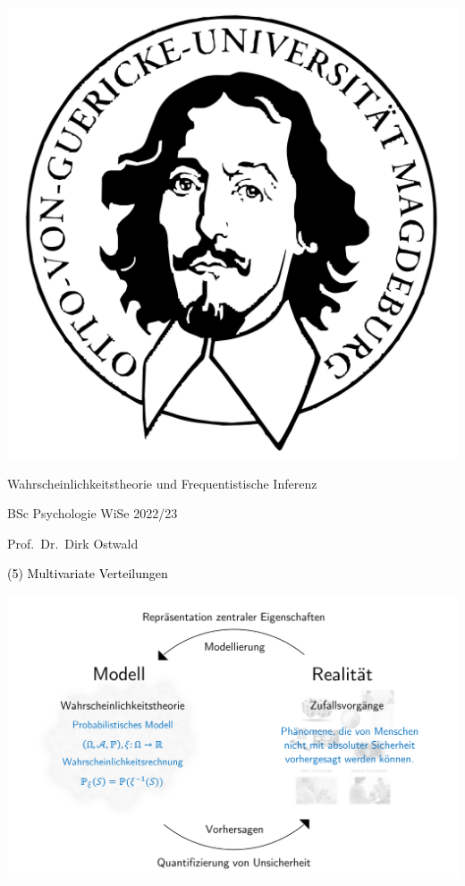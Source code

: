 \documentclass[
  8pt,
  ignorenonframetext,
]{beamer}
\author{}
\date{\vspace{-2.5em}}
\begin{document}
\begin{frame}[plain]{}
\protect\hypertarget{section}{}
\center

\begin{center}\includegraphics[width=0.2\linewidth]{5_Abbildungen/wtfi_5_otto} \end{center}

\vspace{2mm}

\Large

Wahrscheinlichkeitstheorie und Frequentistische Inferenz \vspace{6mm}

\large

BSc Psychologie WiSe 2022/23

\vspace{6mm}
\large

Prof.~Dr.~Dirk Ostwald
\end{frame}

\begin{frame}[plain]{}
\protect\hypertarget{section-1}{}
\vfill
\center
\huge

\textcolor{black}{(5) Multivariate Verteilungen} \vfill
\end{frame}

\begin{frame}{}
\protect\hypertarget{section-2}{}
\begin{center}\includegraphics[width=0.95\linewidth]{5_Abbildungen/wtfi_5_wahrscheinlichkeitstheorie_modell} \end{center}
\end{frame}
\end{document}
